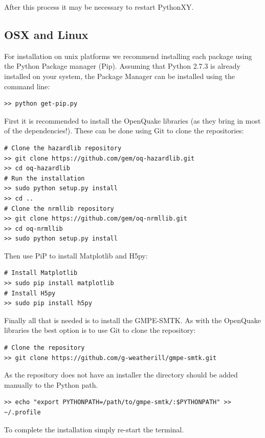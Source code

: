After this process it may be necessary to restart PythonXY.

\subsection{OSX and Linux}

For installation on unix platforms we recommend installing each package using the Python Package manager (Pip). Assuming that Python 2.7.3 is already installed on your system, the Package Manager can be installed using the command line:

\begin{verbatim}
>> python get-pip.py 
\end{verbatim}

First it is recommended to install the OpenQuake libraries (as they bring in most of the dependencies!). These can be done using Git to clone the repositories:

\begin{verbatim}
# Clone the hazardlib repository
>> git clone https://github.com/gem/oq-hazardlib.git
>> cd oq-hazardlib
# Run the installation
>> sudo python setup.py install
>> cd ..
# Clone the nrmllib repository
>> git clone https://github.com/gem/oq-nrmllib.git
>> cd oq-nrmllib
>> sudo python setup.py install
\end{verbatim}

Then use PiP to install Matplotlib and H5py:

\begin{verbatim}
# Install Matplotlib
>> sudo pip install matplotlib
# Install H5py
>> sudo pip install h5py
\end{verbatim}

Finally all that is needed is to install the GMPE-SMTK. As with the OpenQuake libraries the best option is to use Git to clone the repository:

\begin{verbatim}
# Clone the repository
>> git clone https://github.com/g-weatherill/gmpe-smtk.git
\end{verbatim}

As the repository does not have an installer the directory should be added manually to the Python path. 

\begin{verbatim}
>> echo "export PYTHONPATH=/path/to/gmpe-smtk/:$PYTHONPATH" >> ~/.profile
\end{verbatim}

To complete the installation simply re-start the terminal.








